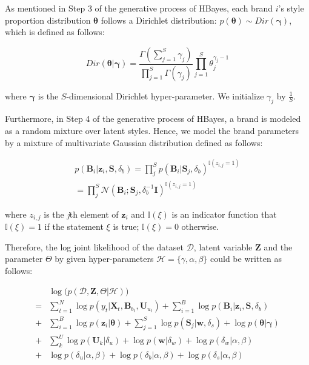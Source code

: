 As mentioned in Step 3 of the generative process of HBayes, each brand $i$'s style proportion distribution $\boldsymbol{\theta}$ follows a Dirichlet distribution: $p(\boldsymbol{\theta}) \sim Dir(\boldsymbol{\gamma})$, which is defined as follows: 

\begin{equation*}
Dir(\bm{\theta}|\bm{\gamma})=\frac{\Gamma(\sum_{j=1}^{S}\gamma_j)}{\prod_{j=1}^{S}\Gamma(\gamma_j)}\prod_{j=1}^S \theta_j^{\gamma_j-1}
\end{equation*}

\noindent where $\bm{\gamma}$ is the $S$-dimensional Dirichlet hyper-parameter. We initialize $\gamma_j$ by $\frac{1}{S}$. 

Furthermore, in Step 4 of the generative process of HBayes, a brand is modeled as a random mixture over latent styles. Hence, we model the brand parameters by a mixture of multivariate Gaussian distribution defined as follows:

\begin{eqnarray*}
p(\bm{B}_i|\bm{z}_i,\bm{S},\delta_b) = \prod_{j}^S p(\bm{B}_i|\bm{S}_j,\delta_b)^{\mathbb{I}(z_{i,j}=1)}\nonumber\\
 = \prod_{j}^S \mathcal{N}(\bm{B}_i; \bm{S}_j,\delta_b^{-1}\mathbf{I}) ^{\mathbb{I}(z_{i,j}=1)}
\end{eqnarray*}

\noindent where $z_{i,j}$ is the \emph{j}th element of $\mathbf{z}_i$ and $\mathbb{I}(\xi)$ is an indicator function that $\mathbb{I}(\xi)=1$ if the statement $\xi$ is true; $\mathbb{I}(\xi)=0$ otherwise.

Therefore, the log joint likelihood of the dataset $\mathcal{D}$, latent variable $\bm{Z}$ and the parameter $\Theta$ by given hyper-parameters $\mathcal{H} = \{\gamma, \alpha,\beta\}$ could be written as follows:

\begin{align}
 & \log \big( p(\mathcal{D},\bm{Z},\Theta|\mathcal{H}) \big) \nonumber \\
= & \sum_{t=1}^N \log p(y_t|\bm{X}_t,\bm{B}_{b_t},\bm{U}_{u_t}) + \sum_{i=1}^B \log p(\bm{B}_i|\bm{z}_i,\bm{S},\delta_b)  \nonumber \\
+ & \sum_{i=1}^B \log p(\bm{z}_{i}|\bm{\theta}) + \sum_{j=1}^S \log p(\bm{S}_j|\bm{w},\delta_s) + \log p(\bm{\theta}|\bm{\gamma})   \nonumber \\
+ & \sum_{k}^U \log p(\bm{U}_k|\delta_u) + \log p(\bm{w}|\delta_w) +  \log p(\delta_w|\alpha,\beta) \nonumber  \\
+ & \log p(\delta_u|\alpha,\beta) + \log p(\delta_b|\alpha,\beta) + \log p(\delta_s|\alpha,\beta)
\label{eq:log_likelihood}
\end{align}

